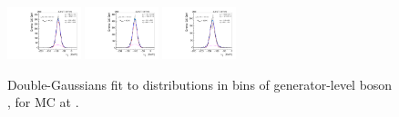 \begin{figure}[htb]
\includegraphics[width=0.19\textwidth]{plots/Appendix_Recoil_Fits/WmmMC_PF_13TeV_2G/pfu1fit_33.pdf}
\includegraphics[width=0.19\textwidth]{plots/Appendix_Recoil_Fits/WmmMC_PF_13TeV_2G/pfu1fit_34.pdf}
\includegraphics[width=0.19\textwidth]{plots/Appendix_Recoil_Fits/WmmMC_PF_13TeV_2G/pfu1fit_35.pdf}
\caption{Double-Gaussians fit to \upar distributions in bins of generator-level boson \pt, for \Wm MC at \serah.}
\label{fig:a:recoil:fit:wm:u1:13}
\end{figure}